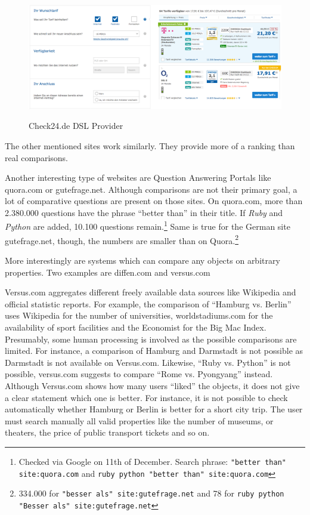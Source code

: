 \begin{figure}[h]
\includegraphics[width=1\textwidth]{images/ds-sys/check24}
\label{img:check24}
\caption{Check24.de DSL Provider}
\end{figure}
The other mentioned sites work similarly. They provide more of a ranking than real comparisons.



Another interesting type of websites are Question Answering Portals like quora.com or gutefrage.net. Although comparisons are not their primary goal, a lot of comparative questions are present on those sites.
On quora.com, more than 2.380.000 questions have the phrase \enquote{better than} in their title. If \emph{Ruby} and \emph{Python} are added, 10.100 questions remain.\footnote{Checked via Google on 11th of December. Search phrase: \texttt{"better than" site:quora.com} and \texttt{ruby python "better than" site:quora.com}}
Same is true for the German site gutefrage.net, though, the numbers are smaller than on Quora.\footnote{334.000 for \texttt{"besser als" site:gutefrage.net} and 78 for \texttt{ruby python "Besser als" site:gutefrage.net}}\newline

More interestingly are systems which can compare any objects on arbitrary properties. Two examples are diffen.com and versus.com

Versus.com aggregates different freely available data sources like Wikipedia and official statistic reports. For example, the comparison of \enquote{Hamburg vs. Berlin} uses Wikipedia for the number of universities, worldstadiums.com for the availability of sport facilities and the Economist for the Big Mac Index. Presumably, some human processing is involved as the possible comparisons are limited. For instance, a comparison of Hamburg and Darmstadt is not possible as Darmstadt is not available on Versus.com. Likewise, \enquote{Ruby vs. Python} is not possible, versus.com suggests to compare \enquote{Rome vs. Pyongyang} instead. Although Versus.com shows how many users \enquote{liked} the objects, it does not give a clear statement which one is better. For instance, it is not possible to check automatically whether Hamburg or Berlin is better for a short city trip. The user must search manually all valid properties like the number of museums, or theaters, the price of public transport tickets and so on.

